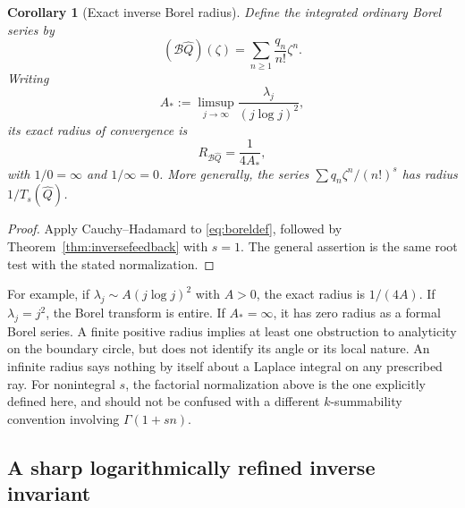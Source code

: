 \documentclass[11pt,a4paper]{article}
\numberwithin{equation}{section}
\newtheorem{corollary}[theorem]{Corollary}
\theoremstyle{definition}
\theoremstyle{remark}
\newcommand{\B}{\mathcal B}
\newcommand{\Q}{\widehat Q}
\begin{document}
\begin{corollary}[Exact inverse Borel radius]
\label{cor:borelradius}
Define the integrated ordinary Borel series by
\begin{equation}
 (\B\Q)(\zeta)=\sum_{n\ge1}\frac{q_n}{n!}\zeta^n.
 \label{eq:boreldef}
\end{equation}
Writing
\[
 A_*:=\limsup_{j\to\infty}\frac{\lambda_j}{(j\log j)^2},
\]
its exact radius of convergence is
\begin{equation}
 \boxed{\displaystyle R_{\B\Q}=\frac1{4A_*},}
 \label{eq:borelradius}
\end{equation}
with $1/0=\infty$ and $1/\infty=0$.
More generally, the series
$\sum q_n\zeta^n/(n!)^s$ has radius $1/T_s(\Q)$.
\end{corollary}
\begin{proof}
Apply Cauchy--Hadamard to \eqref{eq:boreldef}, followed by
Theorem~\ref{thm:inversefeedback} with $s=1$. The general assertion
is the same root test with the stated normalization.
\end{proof}

For example, if $\lambda_j\sim A(j\log j)^2$ with $A>0$, the exact
radius is $1/(4A)$. If $\lambda_j=j^2$, the Borel transform is entire.
If $A_*=\infty$, it has zero radius as a formal Borel series.
A finite positive radius implies at least one obstruction to analyticity
on the boundary circle, but does not identify its angle or its local
nature. An infinite radius says nothing by itself about a Laplace
integral on any prescribed ray. For nonintegral $s$, the factorial
normalization above is the one explicitly defined here, and should not
be confused with a different $k$-summability convention involving
$\Gamma(1+sn)$.

\subsection{A sharp logarithmically refined inverse invariant}
\end{document}
